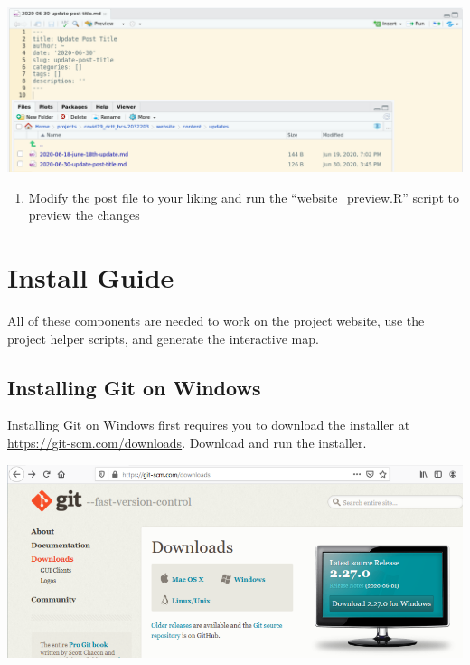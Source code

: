 \documentclass[
]{book}
\providecommand{\tightlist}{%
  \setlength{\itemsep}{0pt}\setlength{\parskip}{0pt}}
\begin{document}
\includegraphics{images/04-newpost_1.png}

\begin{enumerate}
\def\labelenumi{\arabic{enumi}.}
\setcounter{enumi}{2}
\tightlist
\item
  Modify the post file to your liking and run the ``website\_preview.R'' script to preview the changes
\end{enumerate}

\hypertarget{install-guide}{%
\chapter*{Install Guide}\label{install-guide}}

All of these components are needed to work on the project website, use the project helper scripts, and generate the interactive map.

\hypertarget{installing-git-on-windows}{%
\section*{Installing Git on Windows}\label{installing-git-on-windows}}

Installing Git on Windows first requires you to download the installer at \url{https://git-scm.com/downloads}. Download and run the installer.

\includegraphics{images/05-git_1.png}
\end{document}

